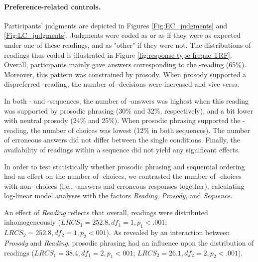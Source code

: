 \documentclass[fleqn,reqno,10pt,draft]{article}
\newcommand{\lc}{\acro{lc}}
\newcommand{\ec}{\acro{ec}}
\begin{document}
\paragraph{Preference-related controls.} Participants' judgments are
depicted in Figures \ref{Fig:EC_judgments} and
\ref{Fig:LC_judgments}. Judgments were coded as \ec or as \lc if they
were as expected under one of these readings, and as "other" if they
were not. The distributions of readings thus coded is illustrated in
Figure \ref{fig:response-type-freque-TRF}.  Overall, participants
mainly gave answers corresponding to the \lc-reading (65\%).
Moreover, this pattern was constrained by prosody. When prosody
supported a dispreferred \ec-reading, the number of \ec-decisions were
increased and vice versa.

In both \lc- and \ec-sequences, the number of \ec-answers was highest
when this reading was supported by prosodic phrasing (30\% and
32\%, respectively), and a bit lower with neutral prosody (24\% and
25\%). When prosodic phrasing supported the \lc-reading, the number of
\ec choices was lowest (12\% in both sequences). The number of
erroneous answers did not differ between the single
conditions. Finally, the availability of readings within a sequence
did not yield any significant effects.


In order to test statistically whether prosodic phrasing and
sequential ordering had an effect on the number of \ec-choices, we
contrasted the number of \ec-choices with non-\ec -choices (i.e.,
\lc-answers and erroneous responses together), calculating log-linear
model analyses with the factors {\it Reading}, {\it Prosody}, and {\it
  Sequence}.

An effect of {\it Reading} reflects that overall, readings were distributed inhomogeneously
($LRCS_1 = 252.8, df_1 =1, p_1 < .001$; $LRCS_2 = 252.8, df_2 =1, p_2 < 001$). 
As revealed by an interaction between {\it Prosody} and
{\it Reading}, prosodic phrasing had an influence upon the distribution of readings 
($LRCS_1 = 38.4, df_1 =2, p_1 < 001$; $LRCS_2 = 26.1, df_2 =2, p_2 < .001$). 
\end{document}
